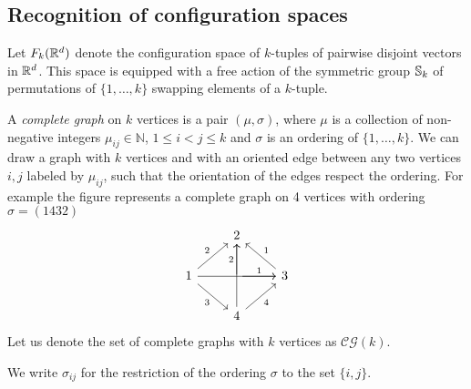 \subsection{Recognition of configuration spaces} \label{ss:recognition}


Let $F_k(\mathbb{R}^{d})$ denote the configuration space of $k$-tuples of pairwise disjoint vectors in $\mathbb{R}^{d}$.
This space is equipped with a free action of the symmetric group $\mathbb{S}_k$ of permutations of $\{1,\dots,k\}$ swapping elements of a $k$-tuple.


\begin{definition}
	A \textit{complete graph} on $k$ vertices is
	a pair $(\mu,\sigma)$, where $\mu$ is a collection of non-negative integers $\mu_{ij}\in\mathbb{N}$, $1 \leq i < j \leq k$
	and $\sigma$ is an ordering of
	$\{1,\dots,k\}$.
	We can draw a graph with $k$ vertices and with an oriented edge between any two vertices $i,j$
	labeled by $\mu_{ij}$, such that the orientation of the edges respect the ordering.
	For example the figure represents a complete graph on 4 vertices with ordering $\sigma=(1432)$
	\begin{equation*}
		\begin{tikzcd}
			\ & 2 & \  \\
			1 \arrow[ur,"2"] \arrow[rr] \arrow[dr,"3"']& \arrow[r,"1"] \arrow[u,"2"] & 3 \arrow[ul,"1"']  \\
			\ & 4 \arrow[ur,"4"'] \arrow[uu] & \
		\end{tikzcd}
	\end{equation*}
	Let us denote the set of complete graphs with $k$ vertices as $\mathcal{CG}(k)$.

	We write $\sigma_{ij}$ for the restriction of the ordering $\sigma$ to the set $\{i,j\}$.
\end{definition}


